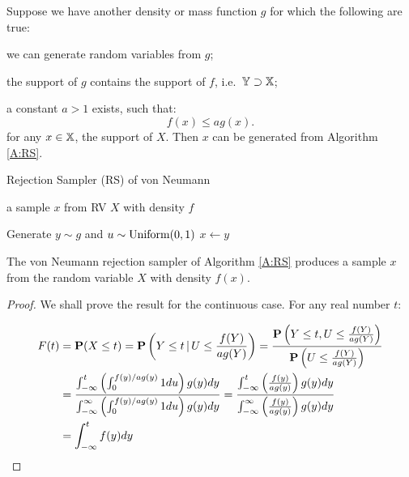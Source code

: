 Suppose we have another density or mass function $g$ for which the following are true:
\begin{asparaenum}[(a)]
\item	we can generate random variables from $g$;
\item	the support of $g$ contains the support of $f$, i.e.~$\mathbb{Y} \supset \mathbb{X}$;
\item	a constant $a > 1$ exists, such that:
\begin{equation}
f(x)\leq ag(x).
\end{equation}
for any $x\in \mathbb{X}$, the support of $X$.  Then $x$ can be generated from Algorithm \ref*{A:RS}.
\end{asparaenum}

\begin{algorithm}
\caption{Rejection Sampler (RS) of von Neumann}
\label{A:RS}
\begin{algorithmic}[1]
 a sample $x$ from RV $X$ with density $f$

\REPEAT
\STATE Generate $y \sim g$ and $u \sim \mbox{{\rm Uniform}}(0,1)$
 $x \gets y$
\end{algorithmic}
\end{algorithm}

\begin{prop}  The von Neumann rejection sampler of Algorithm \ref*{A:RS} produces a sample $x$ from the random variable $X$ with density $f(x)$.
\begin{proof}
We shall prove the result for the continuous case. For any real number $t$:

\begin{eqnarray*}
F(t) &= \mathbf{P}(X \leq t) = \mathbf{P}\left(Y \leq t  \, | \, U \leq\frac{f(Y)}{ag(Y)} \right)
=\frac{\mathbf{P}\left(Y \leq t, U \leq\frac{f(Y)}{ag(Y)} \right)}{\mathbf{P}\left(U \leq\frac{f(Y)}{ag(Y)}\right)}\\
&=\frac{\int^t_{-\infty}\left(\int^{f(y)/ag(y)}_0 1 du\right)g(y)dy}{\int^{\infty}_{-\infty}\left(\int^{f(y)/ag(y)}_0 1 du\right)g(y)dy}
=\frac{\int^t_{-\infty}\left(\frac{f(y)}{ag(y)} \right)g(y)dy}{\int^{\infty}_{-\infty}\left(\frac{f(y)}{ag(y)} \right)g(y)dy}\\
&=\int^t_{-\infty}f(y)dy
\end{eqnarray*}
\end{proof}
\end{prop}

